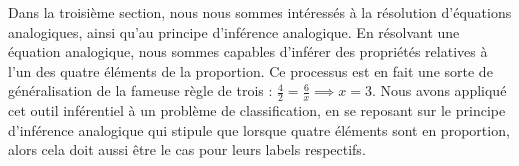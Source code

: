 Dans la troisième section, nous nous sommes intéressés à la résolution
d'équations analogiques, ainsi qu'au principe d'inférence analogique. En résolvant
une équation analogique, nous sommes capables d'inférer des propriétés
relatives à l'un des quatre éléments de la proportion. Ce processus est en fait
une sorte de généralisation de la fameuse règle de trois : $\frac{4}{2} =
\frac{6}{x} \implies x =3$. Nous avons appliqué cet outil inférentiel à un
problème de classification, en se reposant sur le principe d'inférence
analogique qui stipule que lorsque quatre éléments sont en proportion, alors
cela doit aussi être le cas pour leurs labels respectifs.
